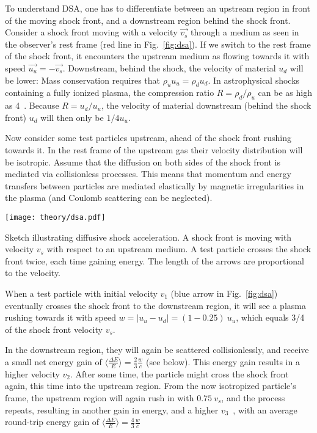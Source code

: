To understand DSA, one has to differentiate between an upstream region in front of the moving shock front, and a downstream region behind the shock front. Consider a shock front moving with a velocity $\vec{v_s}$ through a medium as seen in the observer's rest frame (red line in Fig.~\ref{fig:dsa}). If we switch to the rest frame of the shock front, it encounters the upstream medium as flowing towards it with speed $\vec{u_u}=-\vec{v_s}$. Downstream, behind the shock, the velocity of material $u_d$ will be lower: Mass conservation requires that $\rho_u u_u = \rho_d u_d$. In astrophysical shocks containing a fully ionized plasma, the compression ratio $R=\rho_d/\rho_u$ can be as high as 4~. Because $R=u_d/u_u$, the velocity of material downstream (behind the shock front) $u_d$ will then only be $1/4 u_u$.

Now consider some test particles upstream, ahead of the shock front rushing towards it. In the rest frame of the upstream gas their velocity distribution will be isotropic. Assume that the diffusion on both sides of the shock front is mediated via collisionless processes. This means that momentum and energy transfers between particles are mediated elastically by magnetic irregularities in the plasma (and Coulomb scattering can be neglected).

\begin{marginfigure}
    \texttt{[image: theory/dsa.pdf]}
    \caption[Diffusive shock acceleration]{Sketch illustrating diffusive shock acceleration. A shock front is moving with velocity $v_s$ with respect to an upstream medium. A test particle crosses the shock front twice, each time gaining energy. The length of the arrows are proportional to the velocity.}
\end{marginfigure}

When a test particle with initial velocity $v_1$ (blue arrow in Fig.~\ref{fig:dsa}) eventually crosses the shock front to the downstream region, it will see a plasma rushing towards it with speed $w=|u_u-u_d| = (1-0.25)~u_u$, which equals 3/4 of the shock front velocity $v_s$.

In the downstream region, they will again be scattered collisionlessly, and receive a small net energy gain of $\big\langle\frac{\Delta E}{E}\big\rangle = \frac{2}{3}\frac{w}{c}$ (see below). This energy gain results in a higher velocity $v_2$. After some time, the particle might cross the shock front again, this time into the upstream region. From the now isotropized particle's frame, the upstream region will again rush in with $0.75~v_s$, and the process repeats, resulting in another gain in energy, and a higher $v_3$~, with an average round-trip energy gain of $\big\langle\frac{\Delta E}{E}\big\rangle = \frac{4}{3}\frac{w}{c}$

